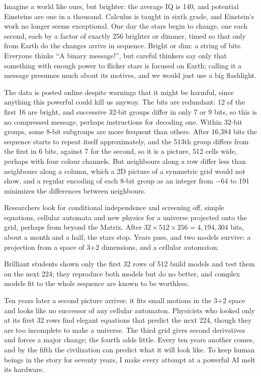
Imagine a world like ours, but brighter: the average IQ is 140, and potential Einsteins are one in a thousand. Calculus is taught in sixth grade, and Einstein's work no longer seems exceptional. One day the stars begin to change, one each second, each by a factor of exactly 256 brighter or dimmer, timed so that only from Earth do the changes arrive in sequence. Bright or dim: a string of bits. Everyone thinks ``A binary message!'', but careful thinkers say only that something with enough power to flicker stars is focused on Earth; calling it a message presumes much about its motives, and we would just use a big flashlight.

The data is posted online despite warnings that it might be harmful, since anything this powerful could kill us anyway. The bits are redundant: 12 of the first 16 are bright, and successive 32-bit groups differ in only 7 or 9 bits, so this is no compressed message, perhaps instructions for decoding one. Within 32-bit groups, some 8-bit subgroups are more frequent than others. After 16,384 bits the sequence starts to repeat itself approximately, and the 513th group differs from the first in 6 bits, against 7 for the second, so it is a picture, 512 cells wide, perhaps with four colour channels. But neighbours along a row differ less than neighbours along a column, which a 2D picture of a symmetric grid would not show, and a regular encoding of each 8-bit group as an integer from $-64$ to 191 minimizes the differences between neighbours.

Researchers look for conditional independence and screening off, simple equations, cellular automata and new physics for a universe projected onto the grid, perhaps from beyond the Matrix. After $32 \times 512 \times 256 = 4{,}194{,}304$ bits, about a month and a half, the stars stop. Years pass, and two models survive: a projection from a space of 3+2 dimensions, and a cellular automaton.

Brilliant students shown only the first 32 rows of 512 build models and test them on the next 224; they reproduce both models but do no better, and complex models fit to the whole sequence are known to be worthless.

Ten years later a second picture arrives: it fits small motions in the 3+2 space and looks like no successor of any cellular automaton. Physicists who looked only at its first 32 rows find elegant equations that predict the next 224, though they are too incomplete to make a universe. The third grid gives second derivatives and forces a major change; the fourth adds little. Every ten years another comes, and by the fifth the civilization can predict what it will look like.  To keep human beings in the story for seventy years, I make every attempt at a powerful AI melt its hardware.

